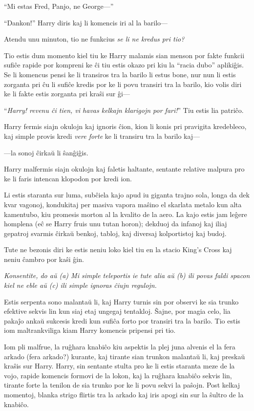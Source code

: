 ``Mi estas Fred, Panjo, ne George—''

``Dankon!'' Harry diris kaj li komencis iri al la barilo—

Atendu unu minuton, tio ne funkcius \emph {se li ne kredus pri tio?}

Tio estis dum momento kiel tiu ke Harry malamis sian menson por fakte
funkcii sufiĉe rapide por kompreni ke ĉi tiu estis okazo pri kiu la
``racia dubo'' aplikiĝis. Se li komencus pensi ke li transiros tra la
barilo li estus bone, nur nun li estis zorganta pri ĉu li sufiĉe
kredis por ke li povu transiri tra la barilo, kio volis diri ke li
fakte estis zorganta pri kraŝi sur ĝi—

``\emph{Harry! revenu ĉi tien, vi havas kelkajn klarigojn por fari!}'' Tiu estis lia patriĉo.

Harry fermis siajn okulojn kaj ignoris ĉion, kion li konis pri
pravigita kredebleco, kaj simple provis kredi \emph{vere forte} ke li
transiru tra la barilo kaj—

—la sonoj ĉirkaŭ li ŝanĝiĝis.

Harry malfermis siajn okulojn kaj faletis haltante, sentante relative
malpura pro ke li faris intencan klopodon por kredi ion.

Li estis staranta sur luma, subĉiela kajo apud iu giganta trajno sola,
longa da dek kvar vagonoj, kondukitaj per masiva vapora maŝino el
skarlata metalo kun alta kamentubo, kiu promesis morton al la kvalito
de la aero. La kajo estis jam leĝere homplena (eĉ se Harry fruis
unu tutan horon); dekduoj da infanoj kaj iliaj gepatroj svarmis
ĉirkaŭ benkoj, tabloj, kaj diversaj kolportistoj kaj budoj.

Tute ne bezonis diri ke estis neniu loko kiel tiu en la stacio King's
Cross kaj neniu ĉambro por kaŝi ĝin.

\emph{Konsentite, do aŭ (a) Mi simple teleportis ie tute alia aŭ (b)
ili povas faldi spacon kiel ne eble aŭ (c) ili simple ignoras ĉiujn
regulojn.}

Estis serpenta sono malantaŭ li, kaj Harry turnis sin por observi ke
sia trunko efektive sekvis lin kun siaj etaj ungegaj tentakloj. Ŝajne,
por magia celo, lia pakaĵo ankaŭ sukcesis kredi kun sufiĉa forto
por transiri tra la barilo. Tio estis iom maltrankviliga kiam Harry
komencis pripensi pri tio.

Iom pli malfrue, la ruĝhara knabiĉo kiu aspektis la plej juna alvenis
el la fera arkado (fera arkado?) kurante, kaj tirante sian trunkon
malantaŭ li, kaj preskaŭ kraŝis sur Harry. Harry, sin sentante stulta
pro ke li estis staranta meze de la vojo, rapide komencis formovi de
la lokon, kaj la ruĝhara knabiĉo sekvis lin, tirante forte la tenilon
de sia trunko por ke li povu sekvi la paŝojn. Post kelkaj momentoj,
blanka strigo flirtis tra la arkado kaj iris apogi sin sur la ŝultro
de la knabiĉo.

